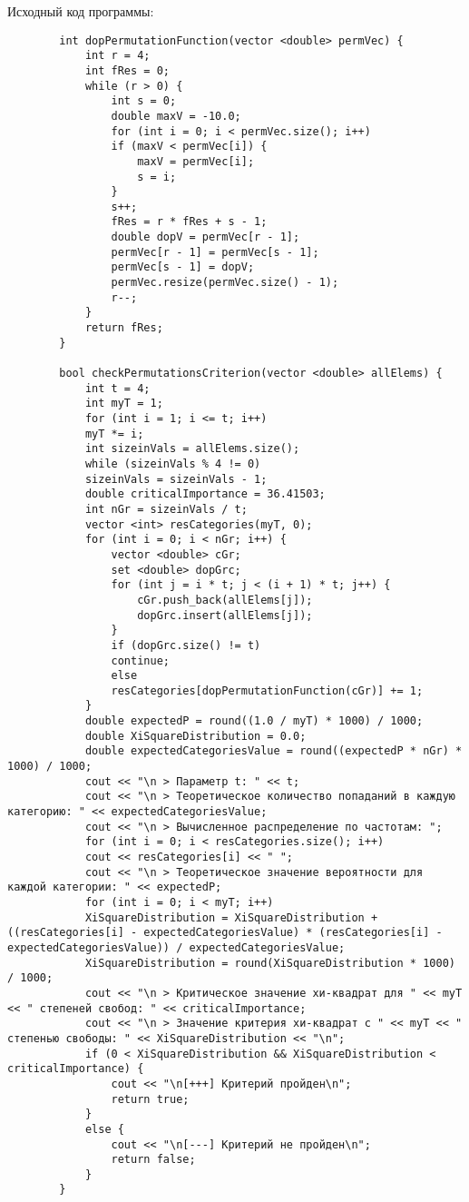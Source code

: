 \documentclass[bachelor, och, coursework]{shiza}
\begin{document}
	Исходный код программы:
	
	\begin{verbatim}
		int dopPermutationFunction(vector <double> permVec) {
			int r = 4;
			int fRes = 0;
			while (r > 0) {
				int s = 0;
				double maxV = -10.0;
				for (int i = 0; i < permVec.size(); i++)
				if (maxV < permVec[i]) {
					maxV = permVec[i];
					s = i;
				}
				s++;
				fRes = r * fRes + s - 1;
				double dopV = permVec[r - 1];
				permVec[r - 1] = permVec[s - 1];
				permVec[s - 1] = dopV;
				permVec.resize(permVec.size() - 1);
				r--;
			}
			return fRes;
		}
		
		bool checkPermutationsCriterion(vector <double> allElems) {
			int t = 4;
			int myT = 1;
			for (int i = 1; i <= t; i++)
			myT *= i;
			int sizeinVals = allElems.size();
			while (sizeinVals % 4 != 0)
			sizeinVals = sizeinVals - 1;
			double criticalImportance = 36.41503;
			int nGr = sizeinVals / t;
			vector <int> resCategories(myT, 0);
			for (int i = 0; i < nGr; i++) {
				vector <double> cGr;
				set <double> dopGrc;
				for (int j = i * t; j < (i + 1) * t; j++) {
					cGr.push_back(allElems[j]);
					dopGrc.insert(allElems[j]);
				}
				if (dopGrc.size() != t)
				continue;
				else
				resCategories[dopPermutationFunction(cGr)] += 1;
			}
			double expectedP = round((1.0 / myT) * 1000) / 1000;
			double XiSquareDistribution = 0.0;
			double expectedCategoriesValue = round((expectedP * nGr) * 1000) / 1000;
			cout << "\n > Параметр t: " << t;
			cout << "\n > Теоретическое количество попаданий в каждую категорию: " << expectedCategoriesValue;
			cout << "\n > Вычисленное распределение по частотам: ";
			for (int i = 0; i < resCategories.size(); i++)
			cout << resCategories[i] << " ";
			cout << "\n > Теоретическое значение вероятности для каждой категории: " << expectedP;
			for (int i = 0; i < myT; i++)
			XiSquareDistribution = XiSquareDistribution + ((resCategories[i] - expectedCategoriesValue) * (resCategories[i] - expectedCategoriesValue)) / expectedCategoriesValue;
			XiSquareDistribution = round(XiSquareDistribution * 1000) / 1000;
			cout << "\n > Критическое значение хи-квадрат для " << myT << " степеней свобод: " << criticalImportance;
			cout << "\n > Значение критерия хи-квадрат с " << myT << " степенью свободы: " << XiSquareDistribution << "\n";
			if (0 < XiSquareDistribution && XiSquareDistribution < criticalImportance) {
				cout << "\n[+++] Критерий пройден\n";
				return true;
			}
			else {
				cout << "\n[---] Критерий не пройден\n";
				return false;
			}
		}
	\end{verbatim}
		
\end{document}
